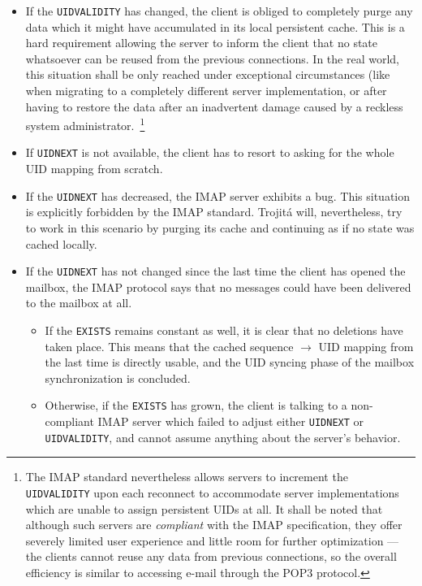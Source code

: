 \documentclass[trojita]{subfiles}
\begin{document}
\begin{itemize}
  \item If the {\tt UIDVALIDITY} has changed, the client is obliged to completely purge any data which it might have
    accumulated in its local persistent cache.  This is a hard requirement allowing the server to inform the client that
    no state whatsoever can be reused from the previous connections.  In the real world, this situation shall be only
    reached under exceptional circumstances (like when migrating to a completely different server implementation, or
    after having to restore the data after an inadvertent damage caused by a reckless system
    administrator.~\footnote{The IMAP standard nevertheless allows servers to increment the {\tt UIDVALIDITY} upon each
    reconnect to accommodate server implementations which are unable to assign persistent UIDs at all.  It shall be
    noted that although such servers are {\em compliant} with the IMAP specification, they offer severely limited user
    experience and little room for further optimization --- the clients cannot reuse any data from previous connections,
    so the overall efficiency is similar to accessing e-mail through the POP3 protocol.}
  \item If {\tt UIDNEXT} is not available, the client has to resort to asking for the whole UID mapping from scratch.
  \item If the {\tt UIDNEXT} has decreased, the IMAP server exhibits a bug.  This situation is explicitly forbidden by
    the IMAP standard.  Trojitá will, nevertheless, try to work in this scenario by purging its cache and continuing as
    if no state was cached locally.
  \item If the {\tt UIDNEXT} has not changed since the last time the client has opened the mailbox, the IMAP protocol
    says that no messages could have been delivered to the mailbox at all.
    \begin{itemize}
      \item If the {\tt EXISTS} remains constant as well, it is clear that no deletions have taken place. This means
        that the cached sequence $\rightarrow$ UID mapping from the last time is directly usable, and the UID syncing
        phase of the mailbox synchronization is concluded.
      \item Otherwise, if the {\tt EXISTS} has grown, the client is talking to a non-compliant IMAP server which failed
        to adjust either {\tt UIDNEXT} or {\tt UIDVALIDITY}, and cannot assume anything about the server's behavior.

\end{itemize}
\end{itemize}
\end{document}
